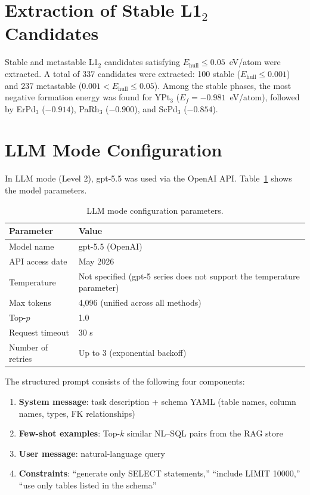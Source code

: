 \documentclass[5p,twocolumn]{elsarticle}
\begin{document}
\section{Extraction of Stable L1$_2$ Candidates}
\label{sec:sup_stable_l12}

Stable and metastable L1$_2$ candidates satisfying
$E_\text{hull} \leq 0.05$~eV/atom were extracted.
A total of 337 candidates were extracted:
100 stable ($E_\text{hull} \leq 0.001$) and 237 metastable
($0.001 < E_\text{hull} \leq 0.05$).
Among the stable phases, the most negative formation energy was found for
YPt$_3$ ($E_f = -0.981$~eV/atom),
followed by ErPd$_3$ ($-0.914$), PaRh$_3$ ($-0.900$),
and ScPd$_3$ ($-0.854$).

\section{LLM Mode Configuration}
\label{sec:sup_llm_config}

In LLM mode (Level 2), gpt-5.5 was used via the OpenAI API.
Table~\ref{tab:sup_llm_params} shows the model parameters.

\begin{table}[htbp]
  \centering
  \caption{LLM mode configuration parameters.}
  \label{tab:sup_llm_params}
  \small
  \begin{tabular}{ll}
    \toprule
    Parameter & Value \\
    \midrule
    Model name & gpt-5.5 (OpenAI) \\
    API access date & May 2026 \\
    Temperature & Not specified (gpt-5 series does not support the temperature parameter) \\
    Max tokens & 4{,}096 (unified across all methods) \\
    Top-$p$ & 1.0 \\
    Request timeout & 30 s \\
    Number of retries & Up to 3 (exponential backoff) \\
    \bottomrule
  \end{tabular}
\end{table}

The structured prompt consists of the following four components:

\begin{enumerate}
  \item \textbf{System message}: task description + schema YAML (table names, column names, types, FK relationships)
  \item \textbf{Few-shot examples}: Top-$k$ similar NL--SQL pairs from the RAG store
  \item \textbf{User message}: natural-language query
  \item \textbf{Constraints}: ``generate only SELECT statements,'' ``include LIMIT 10000,''
        ``use only tables listed in the schema''
\end{enumerate}
\end{document}
